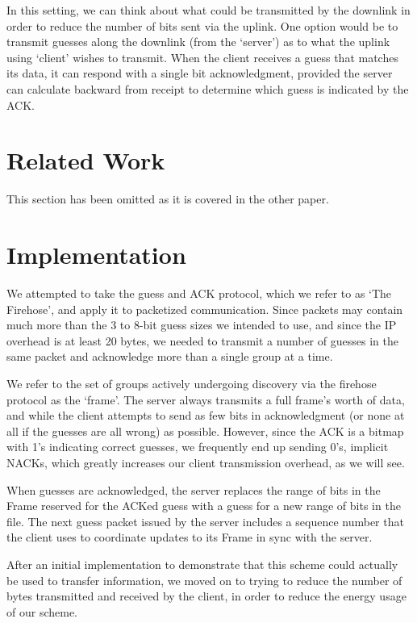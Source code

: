\documentclass[conference]{IEEEtran}
\begin{document}
In this setting, we can think about what could be transmitted by the
downlink in order to reduce the number of bits sent via the uplink.
One option would be to transmit guesses along the downlink (from the
`server') as to what the uplink using `client' wishes to transmit.
When the client receives a guess that matches its data, it can respond
with a single bit acknowledgment, provided the server can calculate
backward from receipt to determine which guess is indicated by the ACK.

\section{Related Work}
This section has been omitted as it is covered in the other paper.

\section{Implementation}
We attempted to take the guess and ACK protocol, which we refer to as
`The Firehose', and apply it to packetized communication.  Since
packets may contain much more than the 3 to 8-bit guess sizes we
intended to use, and since the IP overhead is at least 20 bytes, we
needed to transmit a number of guesses in the same packet and
acknowledge more than a single group at a time.

We refer to the set of groups actively undergoing discovery via the
firehose protocol as the `frame'.  The server always transmits a
full frame's worth of data, and while the client attempts to send as
few bits in acknowledgment (or none at all if the guesses are all
wrong) as possible.  However, since the ACK is a bitmap with 1's
indicating correct guesses, we frequently end up sending 0's, implicit
NACKs, which greatly increases our client transmission overhead, as we
will see.

When guesses are acknowledged, the server replaces the range of bits
in the Frame reserved for the ACKed guess with a guess for a new range
of bits in the file.  The next guess packet issued by the server
includes a sequence number that the client uses to coordinate updates
to its Frame in sync with the server.

After an initial implementation to demonstrate that this scheme could
actually be used to transfer information, we moved on to trying to
reduce the number of bytes transmitted and received by the client, in
order to reduce the energy usage of our scheme.
\end{document}
